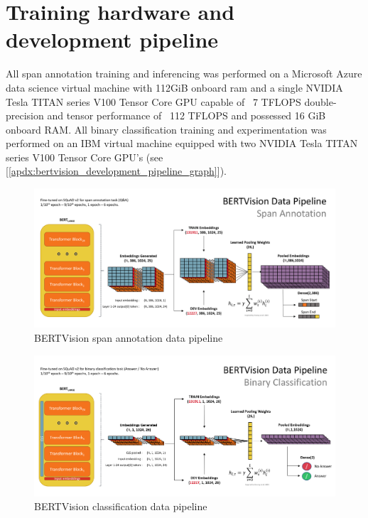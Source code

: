 \section{Training hardware and development pipeline}
\label{apdx:training_hardware}

All span annotation training and inferencing was performed on a Microsoft Azure data science virtual machine with 112GiB onboard ram and a single NVIDIA Tesla TITAN series V100 Tensor Core GPU capable of ~7 TFLOPS double-precision and tensor performance of ~112 TFLOPS and possessed 16 GiB onboard RAM.  All binary classification training and experimentation was performed on an IBM virtual machine equipped with two NVIDIA Tesla TITAN series V100 Tensor Core GPU's (see [\ref{apdx:bertvision_development_pipeline_graph}]).

\begin{figure}[t]
	\centering
	\includegraphics[width=\textwidth]{images/Data_Pipeline_Span_Annotation.png}%
	\caption{BERTVision span annotation data pipeline}
	\label{apdx:bertvision_span_annotation_data_pipeline_graph}
\end{figure}

\begin{figure}[!h]
	\centering
	\includegraphics[width=\textwidth]{images/Data_Pipeline_Binary_Classification.png}%
	\caption{BERTVision classification data pipeline}
	\label{apdx:bertvision_classification_data_pipeline_graph}
\end{figure}


